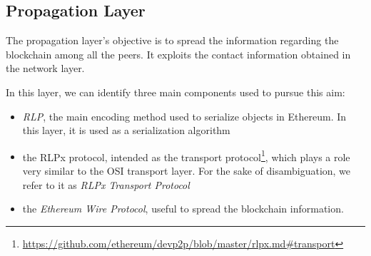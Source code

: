 \subsection{Propagation Layer}
\label{sec:propagation-layer}

The propagation layer's objective is to spread the information regarding the
blockchain among all the peers. It exploits the contact information obtained
in the network layer.

In this layer, we can identify three main components used to pursue this aim:
\begin{itemize}
  \item \emph{RLP}, the main encoding method used to serialize objects in Ethereum. In
  this layer, it is used as a serialization algorithm
  \item the RLPx protocol, intended as the transport
  protocol\footnote{\url{https://github.com/ethereum/devp2p/blob/master/rlpx.md\#transport}},
  which plays a role very similar to the OSI transport layer. For the sake of
  disambiguation, we refer to it as \emph{RLPx Transport Protocol}
  \item the \emph{Ethereum Wire Protocol}, useful to spread the blockchain
  information.
\end{itemize}
